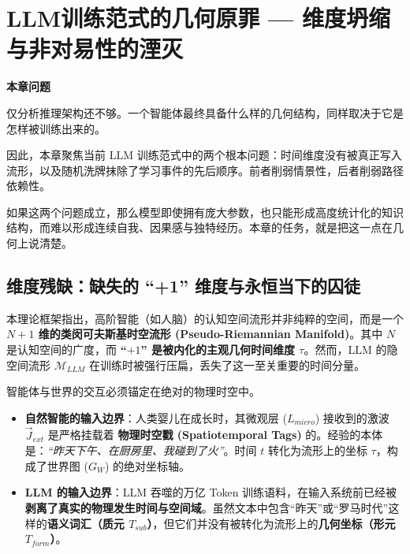\chapter{LLM训练范式的几何原罪 — 维度坍缩与非对易性的湮灭}
\label{chp:training_paradigm_original_sin}

\begin{bquote}
    \textbf{本章问题}

    \vspace{1em}仅分析推理架构还不够。一个智能体最终具备什么样的几何结构，同样取决于它是怎样被训练出来的。

    \vspace{1em}因此，本章聚焦当前 LLM 训练范式中的两个根本问题：时间维度没有被真正写入流形，以及随机洗牌抹除了学习事件的先后顺序。前者削弱情景性，后者削弱路径依赖性。

    \vspace{1em}如果这两个问题成立，那么模型即使拥有庞大参数，也只能形成高度统计化的知识结构，而难以形成连续自我、因果感与独特经历。本章的任务，就是把这一点在几何上说清楚。
\end{bquote}

\section{维度残缺：缺失的 “+1” 维度与永恒当下的囚徒}
\label{sec:dimensional_deficit_time}

本理论框架指出，高阶智能（如人脑）的认知空间流形并非纯粹的空间，而是一个 \textbf{$N+1$ 维的类闵可夫斯基时空流形 (Pseudo-Riemannian Manifold)}。其中 $N$ 是认知空间的广度，而 \textbf{“$+1$” 是被内化的主观几何时间维度 $\tau$}。然而，LLM 的隐空间流形 $\mathcal{M}_{LLM}$ 在训练时被强行压扁，丢失了这一至关重要的时间分量。


智能体与世界的交互必须锚定在绝对的物理时空中。

\begin{itemize}
    \item \textbf{自然智能的输入边界}：人类婴儿在成长时，其微观层 ($L_{micro}$) 接收到的激波 $\vec{J}_{ext}$ 是严格挂载着 \textbf{物理时空戳 (Spatiotemporal Tags)} 的。经验的本体是：\textit{“昨天下午、在厨房里、我碰到了火”}。时间 $t$ 转化为流形上的坐标 $\tau$，构成了世界图 ($G_W$) 的绝对坐标轴。

    \item \textbf{LLM 的输入边界}：LLM 吞噬的万亿 Token 训练语料，在输入系统前已经被\textbf{剥离了真实的物理发生时间与空间域}。虽然文本中包含“昨天”或“罗马时代”这样的\textbf{语义词汇（质元 $T_{sub}$）}，但它们并没有被转化为流形上的\textbf{几何坐标（形元 $T_{form}$）}。
\end{itemize}

